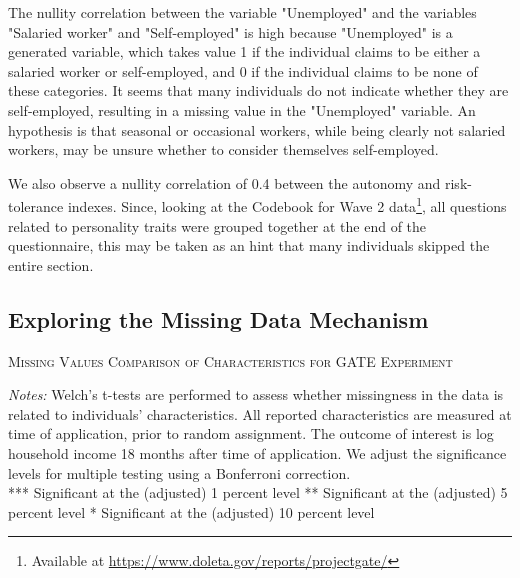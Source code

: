 The nullity correlation between the variable "Unemployed" and the variables "Salaried worker" and "Self-employed" is high because "Unemployed" is a generated variable, which takes value 1 if the individual claims to be either a salaried worker or self-employed, and 0 if the individual claims to be none of these categories. It seems that many individuals do not indicate whether they are self-employed, resulting in a missing value in the "Unemployed" variable. An hypothesis is that seasonal or occasional workers, while being clearly not salaried workers, may be unsure whether to consider themselves self-employed.

We also observe a nullity correlation of 0.4 between the autonomy and risk-tolerance indexes. Since, looking at the Codebook for Wave 2 data\footnote{Available at \url{https://www.doleta.gov/reports/projectgate/}}, all questions related to personality traits were grouped together at the end of the questionnaire, this may be taken as an hint that many individuals skipped the entire section.


\subsection{Exploring the Missing Data Mechanism}

\begin{table}[t!]
\centering
\caption{\textsc{Missing Values Comparison of Characteristics for GATE Experiment}}
\begin{adjustbox}{width=\textwidth,totalheight=\textheight,keepaspectratio}

\end{adjustbox}


\label{tab:table_missing}
\medskip
\raggedright
\footnotesize
\textit{Notes:} Welch's t-tests are performed to assess whether missingness in the data is related to individuals' characteristics.
All reported characteristics are measured at time of application, prior to random assignment. The outcome of interest is log household income 18 months after time of application. We adjust the significance levels for multiple testing using a Bonferroni correction. \\
*** Significant at the (adjusted) 1 percent level ** Significant at the (adjusted) 5 percent level * Significant at the (adjusted) 10 percent level
\end{table}

